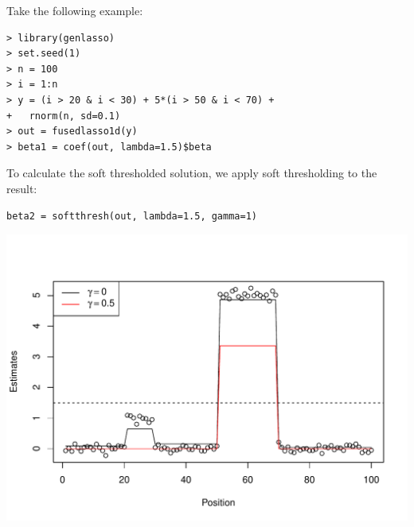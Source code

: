 \begin{frame}[fragile]

Take the following example:
\begin{verbatim}
> library(genlasso)
> set.seed(1)
> n = 100
> i = 1:n
> y = (i > 20 & i < 30) + 5*(i > 50 & i < 70) +
+   rnorm(n, sd=0.1)
> out = fusedlasso1d(y)
> beta1 = coef(out, lambda=1.5)$beta
\end{verbatim}
To calculate the soft thresholded solution, we apply soft thresholding to
the result:
\begin{verbatim}
beta2 = softthresh(out, lambda=1.5, gamma=1)
\end{verbatim}

\end{frame}

\begin{frame}

\begin{center}
\includegraphics[width=\textwidth]{img/eq7x.pdf}
\end{center}

\end{frame}

